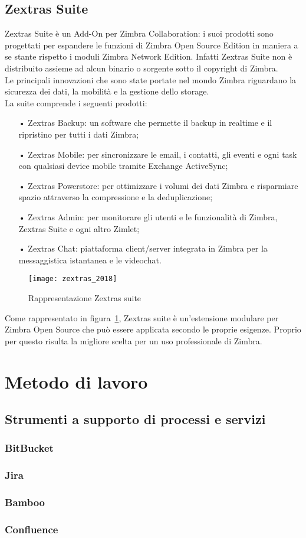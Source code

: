 \subsection{Zextras Suite}
Zextras Suite è un Add-On per Zimbra Collaboration: i suoi prodotti sono progettati per espandere le funzioni di Zimbra Open Source Edition in maniera a se stante rispetto i moduli Zimbra Network Edition. Infatti Zextras Suite non è distribuito assieme ad alcun binario o sorgente sotto il copyright di Zimbra. \\
Le principali innovazioni che sono state portate nel mondo Zimbra riguardano la sicurezza dei dati, la mobilità e la gestione dello storage.\\
La suite comprende i seguenti prodotti:
	\begin{itemize}
		\item[•] Zextras Backup: un software che permette il backup in realtime e il ripristino per tutti i dati Zimbra;
		\item[•] Zextras Mobile: per sincronizzare le email, i contatti, gli eventi e ogni task con qualsiasi device mobile tramite Exchange ActiveSync;
		\item[•] Zextras Powerstore: per ottimizzare i volumi dei dati Zimbra e risparmiare spazio attraverso la compressione e la deduplicazione;
		\item[•] Zextras Admin: per monitorare gli utenti e le funzionalità di Zimbra, Zextras Suite e ogni altro Zimlet;
		\item[•] Zextras Chat: piattaforma client/server integrata in Zimbra per la messaggistica istantanea e le videochat.
	\end{itemize}

\begin{figure}[H] 
	\centering
	\texttt{[image: zextras\_2018]}
	\caption{Rappresentazione Zextras suite}
	\label{fig:modulizextras}
\end{figure}
Come rappresentato in figura~\ref{fig:modulizextras}, Zextras suite è un'estensione modulare per Zimbra Open Source che può essere applicata secondo le proprie esigenze. Proprio per questo risulta la migliore scelta per un uso professionale di Zimbra.

\section{Metodo di lavoro}

\subsection{Strumenti a supporto di processi e servizi}
\subsubsection{BitBucket}
\subsubsection{Jira}
\subsubsection{Bamboo}
\subsubsection{Confluence}

